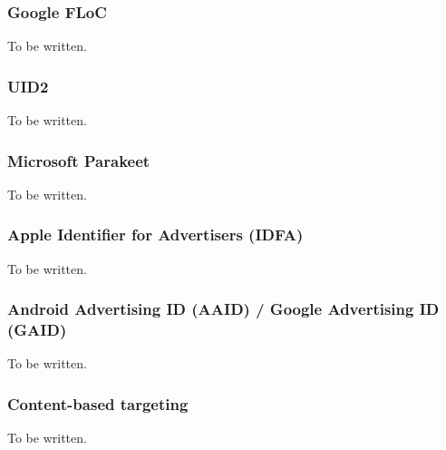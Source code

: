 \subsubsection{Google FLoC}

To be written.

\subsubsection{UID2}

To be written.

\subsubsection{Microsoft Parakeet}

To be written.

\subsubsection{Apple Identifier for Advertisers (IDFA)}

To be written.

\subsubsection{Android Advertising ID (AAID) / Google Advertising ID (GAID)}

To be written.

\subsubsection{Content-based targeting}

To be written.
